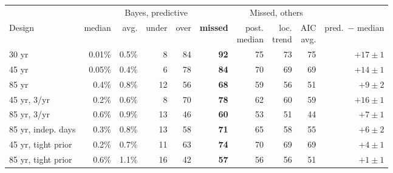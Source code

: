 \begin{tabular}{l rrrrr rrr r}
\toprule
 & \multicolumn{5}{c}{Bayes, predictive} & \multicolumn{3}{c}{Missed, others} & \\
\cmidrule(lr){2-6}\cmidrule(lr){7-9}
Design & median & avg. & under & over & \textbf{missed} & \shortstack{post.\\median} & \shortstack{loc.\\trend} & \shortstack{AIC\\avg.} & \shortstack{pred.\ $-$\\median} \\
\midrule
30 yr & 0.01\% & 0.5\% & 8 & 84 & \textbf{92} & 75 & 73 & 75 & $+17\pm1$ \\
45 yr & 0.05\% & 0.4\% & 6 & 78 & \textbf{84} & 70 & 69 & 69 & $+14\pm1$ \\
85 yr & 0.4\% & 0.8\% & 12 & 56 & \textbf{68} & 59 & 56 & 51 & $+9\pm2$ \\
45 yr, 3/yr & 0.2\% & 0.6\% & 8 & 70 & \textbf{78} & 62 & 60 & 59 & $+16\pm1$ \\
85 yr, 3/yr & 0.6\% & 0.9\% & 13 & 46 & \textbf{60} & 53 & 51 & 44 & $+7\pm1$ \\
85 yr, indep. days & 0.3\% & 0.8\% & 13 & 58 & \textbf{71} & 65 & 58 & 55 & $+6\pm2$ \\
45 yr, tight prior & 0.2\% & 0.7\% & 11 & 63 & \textbf{74} & 70 & 69 & 69 & $+4\pm1$ \\
85 yr, tight prior & 0.6\% & 1.1\% & 16 & 42 & \textbf{57} & 56 & 56 & 51 & $+1\pm1$ \\
\bottomrule
\end{tabular}
